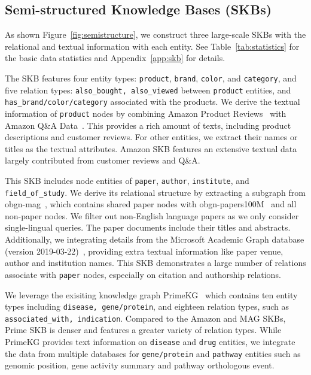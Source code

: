 \vspace{-3pt}
\subsection{Semi-structured Knowledge Bases (SKBs)}
\label{sec:skb}
\vspace{-3pt}

As shown Figure~\ref{fig:semistructure}, we construct three large-scale SKBs with the relational and textual information with each entity. 
See Table~\ref{tab:statistics} for the basic data statistics and Appendix~\ref{app:skb} for details.

The SKB features four entity types: \texttt{product}, \texttt{brand}, \texttt{color}, and \texttt{category}, and five relation types:  \texttt{also\_bought, also\_viewed} between \texttt{product} entities, and
\texttt{has\_brand/color/category} associated with the products. 
We derive the textual information of \texttt{product} nodes by combining Amazon Product Reviews~\cite{ups-amazon_review} with Amazon Q\&A Data~\cite{image_amazon_qa}. 
This provides a rich amount of texts, including product descriptions and customer reviews. 
For other entities, we extract their names or titles as the textual attributes. Amazon SKB features an extensive textual data largely contributed from customer reviews and Q\&A.

This SKB includes node entities of \texttt{paper}, \texttt{author}, \texttt{institute}, and \texttt{field\_of\_study}. We derive its relational structure by extracting a subgraph from obgn-mag~\cite{hu2021open}, which contains shared paper nodes with obgn-papers100M~\cite{hu2021open} and all non-paper nodes. We filter out non-English language papers as we only consider single-lingual queries. 
The paper documents include their titles and abstracts. Additionally, we integrating details from the Microsoft Academic Graph database (version 2019-03-22)~\cite{mag, mag_data}, providing extra textual information like paper venue, author and institution names. 
This SKB demonstrates a large number of relations associate with \texttt{paper} nodes, especially on citation and authorship relations. 


 We leverage the exisiting knowledge graph PrimeKG~\cite{primekg} which contains ten entity types including \texttt{disease, gene/protein}, and eighteen relation types, such as \texttt{associated\_with, indication}.
Compared to the Amazon and MAG SKBs, Prime SKB is denser and features a greater variety of relation types. While PrimeKG provides text information on \texttt{disease} and \texttt{drug} entities, 
we integrate the data from multiple databases for \texttt{gene/protein} and \texttt{pathway} entities such as genomic position, gene activity summary and pathway orthologous event.



